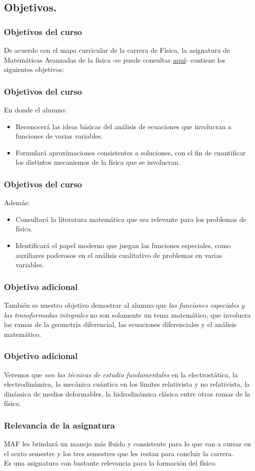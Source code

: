 \subsection{Objetivos.}
\begin{frame}
\frametitle{Objetivos del curso}
De acuerdo con el mapa curricular de la carrera de Física, la asignatura de Matemáticas Avanzadas de la física -se puede consultar \href{http://www.fciencias.unam.mx/asignaturas/610.pdf}{aquí}- contiene los siguientes objetivos:
\end{frame}
\begin{frame}
\frametitle{Objetivos del curso}
En donde el alumno:
\begin{itemize}
\setlength{\itemsep}{0mm}
\item Reconocerá las ideas básicas del análisis de ecuaciones que involucran a funciones de varias variables.
\item Formulará aproximaciones consistentes a soluciones, con el fin de cuantificar los distintos mecanismos de la física que se involucran.
\end{itemize}
\end{frame}
\begin{frame}
\frametitle{Objetivos del curso}
Además:
\begin{itemize}
\setlength{\itemsep}{0mm}
\item Consultará la literatura matemática que sea relevante para los problemas de física.
\item Identificará el papel moderno que juegan las funciones especiales, como auxiliares poderosos en el análisis cualitativo de problemas en varias variables.
\end{itemize}
\end{frame}
\begin{frame}
\frametitle{Objetivo adicional}
También es nuestro objetivo demostrar al alumno que \emph{las funciones especiales y las transformadas integrales} no son solamente un tema matemático, que involucra las ramas de la geometría diferencial, las ecuaciones diferenciales y el análisis matemático.
\end{frame}
\begin{frame}
\frametitle{Objetivo adicional}
Veremos que \emph{son las técnicas de estudio fundamentales} en la electrostática, la electrodinámica, la mecánica cuántica en los límites relativista y no relativista, la dinámica de medios deformables, la hidrodinámica clásica entre otras ramas de la física.
\end{frame}
\begin{frame}
\frametitle{Relevancia de la asignatura}
MAF les brindará un manejo más fluido y consistente para lo que van a cursar en el sexto semestre y los tres semestres que les restan para concluir la carrera.
\\
\bigskip
\pause
Es una asignatura con bastante relevancia para la formación del físico.
\end{frame}

